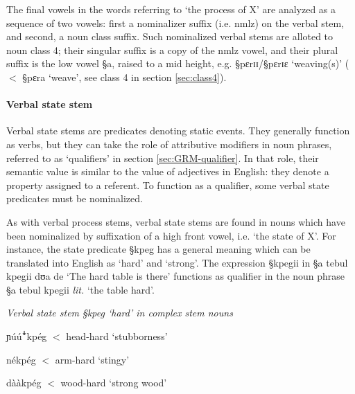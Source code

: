  The final vowels in the
words referring to `the process of X' are analyzed as a sequence of two
vowels: first a nominalizer suffix (i.e. {\sc nmlz})  on the verbal stem,  and
second,  a noun class suffix.  Such nominalized verbal stems are alloted to
noun class 4;  their singular suffix is a copy of the {\sc nmlz} vowel,
and their  plural suffix is the low vowel {\S a}, raised to a mid height, e.g.
{\S pɛrɪɪ}/{\S pɛrɪɛ} `weaving(s)'  ($<$ {\S pɛra} `weave', see class 4
in section \ref{sec:class4}).



\paragraph{Verbal state stem}
\label{sec:GRM-verb-state-stem}

Verbal state stems are  predicates denoting static events. They generally
function  as verbs, but they can take the role of attributive modifiers in
noun phrases, referred to as  `qualifiers' in section \ref{sec:GRM-qualifier}.
In that role, their semantic value is similar to the value of adjectives in
English: they denote a property  assigned to a referent.  To function as  a
qualifier, some verbal state predicates must be nominalized. 

As with verbal process stems,  verbal state stems are found in nouns which
have
been nominalized by suffixation of a  high front vowel, i.e. `the state of X'.
For instance, the state predicate {\S kpeg} has a general meaning which can be
translated into English as `hard' and `strong'. The expression {\S kpegii} in
{\S a tebul kpegii dʊa de} `The hard table is there' functions as qualifier in
the noun phrase {\S a tebul kpegii} {\it lit.} `the table hard'. 


\begin{exe} 
 \ex\label{exːGRM-v-sta-p-hard}{\it Verbal state stem {\S kpeg}  `hard' in
complex stem nouns}
 \begin{xlist}
 \ex\label{exːGRM-v-sta-p-hard-head}
{\I ɲúúꜜkpég} $<$ {\sc head-hard}
`stubborness' 

 \ex\label{exːGRM-v-sta-p-hard-arm}
{\I nékpég} $<$ {\sc arm-hard} `stingy' 

 \ex\label{exːGRM-v-sta-p-hard-tree}
{\I dààkpég} $<$ {\sc wood-hard} `strong wood' 
 \end{xlist}
\end{exe}
 

